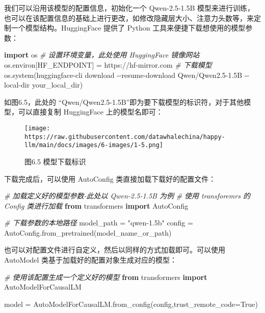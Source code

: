 \documentclass[
]{article}
\newenvironment{Shaded}{}{}
\newcommand{\CommentTok}[1]{\textcolor[rgb]{0.38,0.63,0.69}{\textit{#1}}}
\newcommand{\ImportTok}[1]{\textcolor[rgb]{0.00,0.50,0.00}{\textbf{#1}}}
\newcommand{\NormalTok}[1]{#1}
\newcommand{\OperatorTok}[1]{\textcolor[rgb]{0.40,0.40,0.40}{#1}}
\newcommand{\StringTok}[1]{\textcolor[rgb]{0.25,0.44,0.63}{#1}}
\newcommand{\VariableTok}[1]{\textcolor[rgb]{0.10,0.09,0.49}{#1}}
\begin{document}
我们可以沿用该模型的配置信息，初始化一个 Qwen-2.5-1.5B
模型来进行训练，也可以在该配置信息的基础上进行更改，如修改隐藏层大小、注意力头数等，来定制一个模型结构。HuggingFace
提供了 Python 工具来便捷下载想使用的模型参数：

\begin{Shaded}
\begin{Highlighting}[]
\ImportTok{import}\NormalTok{ os}
\CommentTok{\# 设置环境变量，此处使用 HuggingFace 镜像网站}
\NormalTok{os.environ[}\StringTok{\textquotesingle{}HF\_ENDPOINT\textquotesingle{}}\NormalTok{] }\OperatorTok{=} \StringTok{\textquotesingle{}https://hf{-}mirror.com\textquotesingle{}}
\CommentTok{\# 下载模型}
\NormalTok{os.system(}\StringTok{\textquotesingle{}huggingface{-}cli download {-}{-}resume{-}download Qwen/Qwen2.5{-}1.5B {-}{-}local{-}dir your\_local\_dir\textquotesingle{}}\NormalTok{)}
\end{Highlighting}
\end{Shaded}

如图6.5，此处的
``Qwen/Qwen2.5-1.5B''即为要下载模型的标识符，对于其他模型，可以直接复制
HuggingFace 上的模型名即可：

\begin{figure}[htbp]\centering
\texttt{[image: https://raw.githubusercontent.com/datawhalechina/happy-llm/main/docs/images/6-images/1-5.png]}
\caption{图6.5 模型下载标识}
\end{figure}

下载完成后，可以使用 AutoConfig 类直接加载下载好的配置文件：

\begin{Shaded}
\begin{Highlighting}[]
\CommentTok{\# 加载定义好的模型参数{-}此处以 Qwen{-}2.5{-}1.5B 为例}
\CommentTok{\# 使用 transforemrs 的 Config 类进行加载}
\ImportTok{from}\NormalTok{ transformers }\ImportTok{import}\NormalTok{ AutoConfig}

\CommentTok{\# 下载参数的本地路径}
\NormalTok{model\_path }\OperatorTok{=} \StringTok{"qwen{-}1.5b"}
\NormalTok{config }\OperatorTok{=}\NormalTok{ AutoConfig.from\_pretrained(model\_name\_or\_path)}
\end{Highlighting}
\end{Shaded}

也可以对配置文件进行自定义，然后以同样的方式加载即可。可以使用 AutoModel
类基于加载好的配置对象生成对应的模型：

\begin{Shaded}
\begin{Highlighting}[]
\CommentTok{\# 使用该配置生成一个定义好的模型}
\ImportTok{from}\NormalTok{ transformers }\ImportTok{import}\NormalTok{ AutoModelForCausalLM}

\NormalTok{model }\OperatorTok{=}\NormalTok{ AutoModelForCausalLM.from\_config(config,trust\_remote\_code}\OperatorTok{=}\VariableTok{True}\NormalTok{)}
\end{Highlighting}
\end{Shaded}
\end{document}
